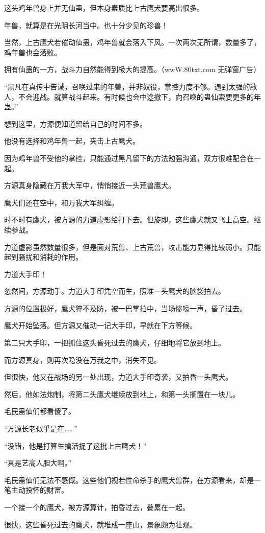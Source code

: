 \begin{this_body}
这头鸡年兽身上并无仙蛊，但本身素质比上古鹰犬要高出很多。

年兽，就算是在光阴长河当中。也十分少见的珍兽！

当然，上古鹰犬若催动仙蛊，鸡年兽就会落入下风。一次两次无所谓，数量多了，鸡年兽也会落败。

拥有仙蛊的一方，战斗力自然能得到极大的提高。（wwW.80txt.com 无弹窗广告）

“黑凡在真传中告诫，召唤过来的年兽，并非奴役，掌控力度不够。遇到太强的敌人，不会迎战。就算战斗起来。有时候也会中途撤下，向召唤的蛊仙索要更多的年蛊。”

想到这里，方源便知道留给自己的时间不多。

他没有选择和鸡年兽一起，夹击上古鹰犬。

因为鸡年兽不受他的掌控，只能通过黑凡留下的方法勉强沟通，双方很难配合在一起。

方源真身隐藏在万我大军中，悄悄接近一头荒兽鹰犬。

鹰犬们还在空中，和万我大军纠缠。

时不时有鹰犬，被方源的力道虚影给打下去。但旋即，这些鹰犬就又飞上高空。继续参战。

力道虚影虽然数量很多，但是面对荒兽、上古荒兽，攻击能力显得比较弱小。只能起到骚扰和消耗的作用。

力道大手印！

忽然间，方源动手。力道大手印凭空而生，照准一头鹰犬的脑袋拍去。

方源的位置极好，鹰犬猝不及防，被一巴掌拍中，当场惨嚎一声，昏了过去。

鹰犬开始坠落。但方源又催动一记大手印，早就在下方等候。

第二只大手印，一把抓住这头昏死过去的鹰犬，仔细地将它放到地上。

而方源真身，则再次隐没在万我之中，消失不见。

但很快，他又在战场的另一处出现，力道大手印奇袭，又拍昏一头鹰犬。

然后，他如法炮制，将第二头鹰犬继续放到地上，和第一头搁置在一块儿。

毛民蛊仙们都看傻了。

“方源长老似乎是在……”

“没错，他是打算生擒活捉了这批上古鹰犬！”

“真是艺高人胆大啊。”

毛民蛊仙们无法不感慨。这些他们视若性命杀手的鹰犬兽群，在方源看来，却是一笔主动投怀的财富。

一个接一个的鹰犬，被方源算计，拍昏过去，叠累在一起。

很快，这些昏死过去的鹰犬，就堆成一座山，景象颇为壮观。


\end{this_body}
